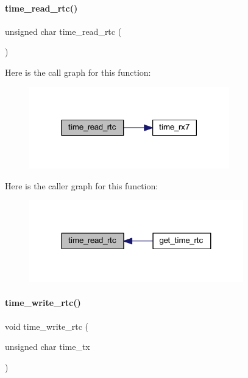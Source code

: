 \paragraph{time\+\_\+read\+\_\+rtc()}
{\footnotesize\ttfamily unsigned char time\+\_\+read\+\_\+rtc (\begin{DoxyParamCaption}{ }\end{DoxyParamCaption})}

Here is the call graph for this function\+:
\nopagebreak
\begin{figure}[H]
\begin{center}
\leavevmode
\includegraphics[width=246pt]{a00044_addeadab81b94cc879a2d7f1310fad7cd_cgraph}
\end{center}
\end{figure}
Here is the caller graph for this function\+:
\nopagebreak
\begin{figure}[H]
\begin{center}
\leavevmode
\includegraphics[width=263pt]{a00044_addeadab81b94cc879a2d7f1310fad7cd_icgraph}
\end{center}
\end{figure}
\mbox{\label{a00044_a67147f11d1f34a31e84b38dd81ccb553}} 
\paragraph{time\+\_\+write\+\_\+rtc()}
{\footnotesize\ttfamily void time\+\_\+write\+\_\+rtc (\begin{DoxyParamCaption}\item[{unsigned char}]{time\+\_\+tx }\end{DoxyParamCaption})}

